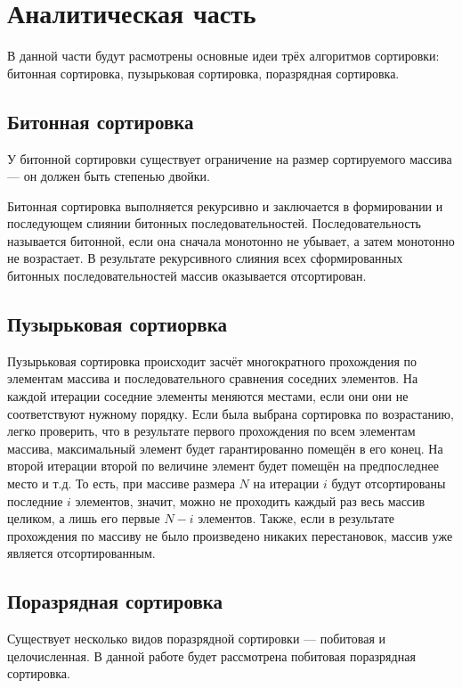 \section{Аналитическая часть}

В данной части будут расмотрены основные идеи трёх алгоритмов сортировки: битонная сортировка, пузырьковая сортировка, поразрядная сортировка.

\subsection{Битонная сортировка}

У битонной сортировки существует ограничение на размер сортируемого массива --- он должен быть степенью двойки.

Битонная сортировка выполняется рекурсивно и заключается в формировании и последующем слиянии битонных последовательностей.
Последовательность называется битонной, если она сначала монотонно не убывает, а затем монотонно не возрастает.
В результате рекурсивного слияния всех сформированных битонных последовательностей массив оказывается отсортирован.

\subsection{Пузырьковая сортиорвка}

Пузырьковая сортировка происходит засчёт многократного прохождения по элементам массива и последовательного сравнения соседних элементов.
На каждой итерации соседние элементы меняются местами, если они они не соответствуют нужному порядку.
Если была выбрана сортировка по возрастанию, легко проверить, что в результате первого прохождения по всем элементам массива, максимальный элемент будет гарантированно помещён в его конец.
На второй итерации второй по величине элемент будет помещён на предпоследнее место и т.д.
То есть, при массиве размера $N$ на итерации $i$ будут отсортированы последние $i$ элементов, значит, можно не проходить каждый раз весь массив целиком, а лишь его первые $N - i$ элементов.
Также, если в результате прохождения по массиву не было произведено никаких перестановок, массив уже является отсортированным.

\subsection{Поразрядная сортировка}

Существует несколько видов поразрядной сортировки --- побитовая и целочисленная.
В данной работе будет рассмотрена побитовая поразрядная сортировка.

